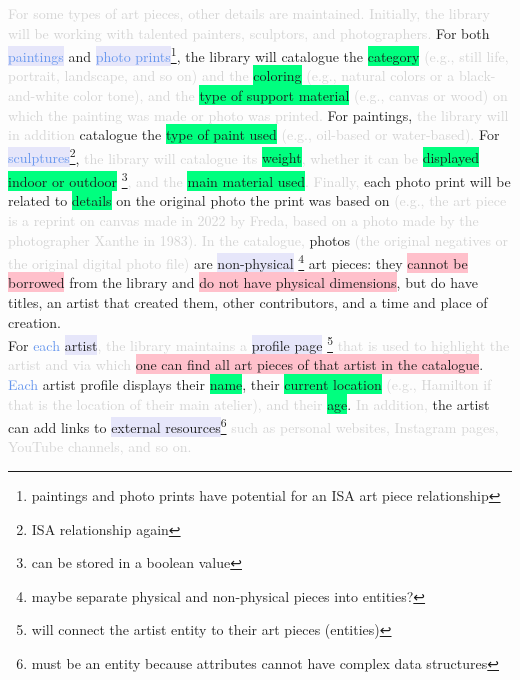\documentclass[11pt]{article}
\begin{document}
\textcolor{lightgray}{For some types of art pieces, other details are maintained. Initially, the library will be working with talented painters, sculptors, and photographers.} For both \colorbox{Lavender}{\textcolor{CornflowerBlue}{paintings}} and \colorbox{Lavender}{\textcolor{CornflowerBlue}{photo prints}}\footnote{paintings and photo prints have potential for an ISA art piece relationship}, the library will catalogue the \colorbox{SpringGreen}{category} \textcolor{lightgray}{(e.g., still life, portrait, landscape, and so on) and the} \colorbox{SpringGreen}{coloring} \textcolor{lightgray}{(e.g., natural colors or a black-and-white color tone), and the} \colorbox{SpringGreen}{type of support material} \textcolor{lightgray}{(e.g., canvas or wood) on which the painting was made or photo was printed.} For paintings, \textcolor{lightgray}{the library will in addition} catalogue the \colorbox{SpringGreen}{type of paint used} \textcolor{lightgray}{(e.g., oil-based or water-based).} For \colorbox{Lavender}{\textcolor{CornflowerBlue}{sculptures}}\footnote{ISA relationship again}, \textcolor{lightgray}{the library will catalogue its} \colorbox{SpringGreen}{weight}\textcolor{lightgray}{, whether it can be} \colorbox{SpringGreen}{displayed indoor or outdoor} \footnote{can be stored in a boolean value}\textcolor{lightgray}{, and the} \colorbox{SpringGreen}{main material used}\textcolor{lightgray}{. Finally,} each photo print will be related to \colorbox{SpringGreen}{details} on the original photo the print was based on \textcolor{lightgray}{(e.g., the art piece is a reprint on canvas made in 2022 by Freda, based on a photo made by the photographer Xanthe in 1983). In the catalogue,} photos \textcolor{lightgray}{(the original negatives or the original digital photo file)} are \colorbox{Lavender}{non-physical} \footnote{maybe separate physical and non-physical pieces into entities?} art pieces: they \colorbox{pink}{cannot be borrowed} from the library and \colorbox{pink}{do not have physical dimensions}, but do have titles, an artist that created them, other contributors, and a time and place of creation. \\

For \textcolor{CornflowerBlue}{each} \colorbox{Lavender}{artist}\textcolor{lightgray}{, the library maintains a} \colorbox{Lavender}{profile page} \footnote{will connect the artist entity to their art pieces (entities)} \textcolor{lightgray}{that is used to highlight the artist and via which} \colorbox{pink}{one can find all art pieces of that artist in the catalogue}. \textcolor{CornflowerBlue}{Each} artist profile displays their \colorbox{SpringGreen}{name}, their \colorbox{SpringGreen}{current location} \textcolor{lightgray}{(e.g., Hamilton if that is the location of their main atelier), and their} \colorbox{SpringGreen}{age}. \textcolor{lightgray}{In addition,} the artist can
add links to \colorbox{Lavender}{external resources}\footnote{must be an entity because attributes cannot have complex data structures} \textcolor{lightgray}{such as personal websites, Instagram pages, YouTube channels, and so on.} \\
\end{document}
